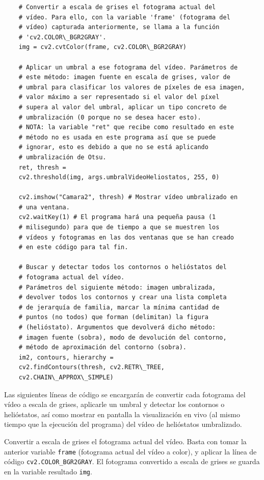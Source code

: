 \begin{lstlisting}
    # Convertir a escala de grises el fotograma actual del
    # vídeo. Para ello, con la variable 'frame' (fotograma del
    # vídeo) capturada anteriormente, se llama a la función
    # 'cv2.COLOR\_BGR2GRAY'.
    img = cv2.cvtColor(frame, cv2.COLOR\_BGR2GRAY)
    
    # Aplicar un umbral a ese fotograma del vídeo. Parámetros de
    # este método: imagen fuente en escala de grises, valor de 
    # umbral para clasificar los valores de píxeles de esa imagen,
    # valor máximo a ser representado si el valor del píxel
    # supera al valor del umbral, aplicar un tipo concreto de
    # umbralización (0 porque no se desea hacer esto).
    # NOTA: la variable "ret" que recibe como resultado en este
    # método no es usada en este programa así que se puede
    # ignorar, esto es debido a que no se está aplicando
    # umbralización de Otsu.
    ret, thresh =
    cv2.threshold(img, args.umbralVideoHeliostatos, 255, 0)
    
    cv2.imshow("Camara2", thresh) # Mostrar vídeo umbralizado en
    # una ventana.
    cv2.waitKey(1) # El programa hará una pequeña pausa (1
    # milisegundo) para que de tiempo a que se muestren los
    # vídeos y fotogramas en las dos ventanas que se han creado
    # en este código para tal fin.

    # Buscar y detectar todos los contornos o helióstatos del
    # fotograma actual del vídeo.
    # Parámetros del siguiente método: imagen umbralizada,
    # devolver todos los contornos y crear una lista completa
    # de jerarquía de familia, marcar la mínima cantidad de
    # puntos (no todos) que forman (delimitan) la figura
    # (helióstato). Argumentos que devolverá dicho método:
    # imagen fuente (sobra), modo de devolución del contorno,
    # método de aproximación del contorno (sobra).
    im2, contours, hierarchy =
    cv2.findContours(thresh, cv2.RETR\_TREE,
    cv2.CHAIN\_APPROX\_SIMPLE)
\end{lstlisting}

Las siguientes líneas de código se encargarán de convertir cada fotograma del vídeo a escala de grises, aplicarle un umbral y detectar los contornos o helióstatos, así como mostrar en pantalla la visualización en vivo (al mismo tiempo que la ejecución del programa) del vídeo de helióstatos umbralizado.

Convertir a escala de grises el fotograma actual del vídeo. Basta con tomar la anterior variable \verb|frame| (fotograma actual del vídeo a color), y aplicar la línea de código \verb|cv2.COLOR_BGR2GRAY|. El fotograma convertido a escala de grises se guarda en la variable resultado \verb|img|.

